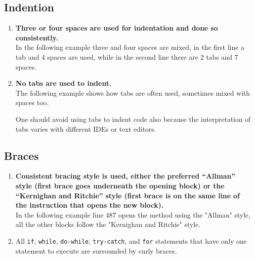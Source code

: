 \documentclass[a4paper,11pt]{report} %
\begin{document}
		\subsection*{Indention}\begin{enumerate}[resume]
			\item \textbf{Three or four spaces are used for indentation and done so consistently.}\smallskip \\
				In the following example three and four spaces are mixed, in the first line a tab and 4 spaces are used, while in the second line there are 2 tabs and 7 spaces.
				
			\item \textbf{No tabs are used to indent.}\smallskip \\
				The following example shows how tabs are often used, sometimes mixed with spaces too.
				
				One should avoid using tabs to indent code also because the interpretation of tabs varies with different IDEs or text editors.
		\end{enumerate}
		
		\subsection*{Braces}\begin{enumerate}[resume]
			\item \textbf{Consistent bracing style is used, either the preferred ``Allman'' style (first brace goes underneath the opening block) or the ``Kernighan and Ritchie'' style (first brace is on the same line of the instruction that opens the new block).}\smallskip \\
				In the following example line 487 opens the method using the "Allman" style, all the other blocks follow the "Kernighan and Ritchie" style.
				
			\item All \texttt{if}, \texttt{while}, \texttt{do-while}, \texttt{try-catch}, and \texttt{for} statements that have only one statement to execute are surrounded by curly braces.			
		\end{enumerate}
		
\end{document}
